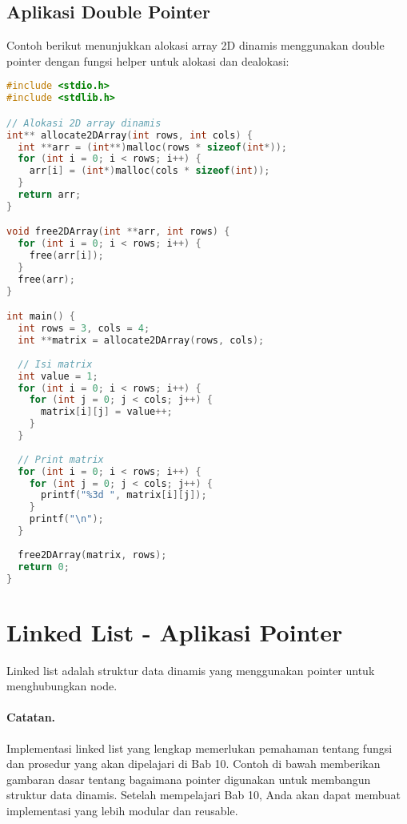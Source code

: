 \documentclass[../main.tex]{subfiles}
\begin{document}
\subsection{Aplikasi Double Pointer}

Contoh berikut menunjukkan alokasi array 2D dinamis menggunakan double pointer dengan fungsi helper untuk alokasi dan dealokasi:

\begin{lstlisting}[language=C, caption={Double pointer untuk 2D array}]
#include <stdio.h>
#include <stdlib.h>

// Alokasi 2D array dinamis
int** allocate2DArray(int rows, int cols) {
  int **arr = (int**)malloc(rows * sizeof(int*));
  for (int i = 0; i < rows; i++) {
    arr[i] = (int*)malloc(cols * sizeof(int));
  }
  return arr;
}

void free2DArray(int **arr, int rows) {
  for (int i = 0; i < rows; i++) {
    free(arr[i]);
  }
  free(arr);
}

int main() {
  int rows = 3, cols = 4;
  int **matrix = allocate2DArray(rows, cols);
  
  // Isi matrix
  int value = 1;
  for (int i = 0; i < rows; i++) {
    for (int j = 0; j < cols; j++) {
      matrix[i][j] = value++;
    }
  }
  
  // Print matrix
  for (int i = 0; i < rows; i++) {
    for (int j = 0; j < cols; j++) {
      printf("%3d ", matrix[i][j]);
    }
    printf("\n");
  }
  
  free2DArray(matrix, rows);
  return 0;
}
\end{lstlisting}

\section{Linked List - Aplikasi Pointer}

Linked list adalah struktur data dinamis yang menggunakan pointer untuk menghubungkan node.

\paragraph{Catatan.} Implementasi linked list yang lengkap memerlukan pemahaman tentang fungsi dan prosedur yang akan dipelajari di Bab 10. Contoh di bawah memberikan gambaran dasar tentang bagaimana pointer digunakan untuk membangun struktur data dinamis. Setelah mempelajari Bab 10, Anda akan dapat membuat implementasi yang lebih modular dan reusable.
\end{document}
